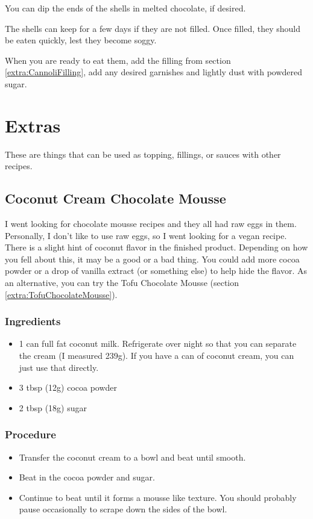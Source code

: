 \documentclass[10pt, openany]{book}
\begin{document}
You can dip the ends of the shells in melted chocolate, if desired.

The shells can keep for a few days if they are not filled.  Once filled, they should be eaten quickly, lest they become soggy.

When you are ready to eat them, add the filling from section \ref{extra:CannoliFilling}, add any desired garnishes and lightly dust with powdered sugar.

\chapter{Extras}
These are things that can be used as topping, fillings, or sauces with other recipes.

\section{Coconut Cream Chocolate Mousse}
\label{extra:CCChocolateMousse}
I went looking for chocolate mousse recipes and they all had raw eggs in them.  Personally, I don't like to use raw eggs, so I went looking for a vegan recipe.  There is a slight hint of coconut flavor in the finished product.  Depending on how you fell about this, it may be a good or a bad thing.  You could add more cocoa powder or a drop of vanilla extract (or something else) to help hide the flavor.  As an alternative, you can try the Tofu Chocolate Mousse (section \ref{extra:TofuChocolateMousse}).
\subsection{Ingredients}
\begin{itemize}
  \item 1 can full fat coconut milk.  Refrigerate over night so that you can separate the cream (I measured 239g).  If you have a can of coconut cream, you can just use that directly.
  \item 3 tbsp (12g) cocoa powder
  \item 2 tbsp (18g) sugar
\end{itemize}
\subsection{Procedure}
\begin{itemize}
  \item Transfer the coconut cream to a bowl and beat until smooth.
  \item Beat in the cocoa powder and sugar.
  \item Continue to beat until it forms a mousse like texture.  You should probably pause occasionally to scrape down the sides of the bowl.
\end{itemize}
\end{document}
